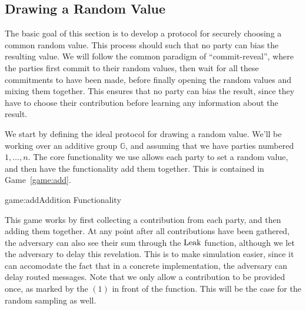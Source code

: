 \subsection{Drawing a Random Value}

The basic goal of this section is to develop a protocol for securely
choosing a common random value.
This process should such that no party can bias the resulting value.
We will follow the common paradigm of ``commit-reveal'', where the parties
first commit to their random values, then wait for all these commitments to have been made,
before finally opening the random values and mixing them together.
This ensures that no party can bias the result, since they have to choose
their contribution before learning any information about the result.

We start by defining the ideal protocol for drawing a random value.
We'll be working over an additive group $\mathbb{G}$,
and assuming that we have parties numbered $1, \ldots, n$.
The core functionality we use allows each party to set a random value,
and then have the functionality add them together.
This is contained in Game~\ref{game:add}.

\begin{game}{game:add}{Addition Functionality}
\end{game}

This game works by first collecting a contribution from each party,
and then adding them together.
At any point after all contributions have been gathered,
the adversary can also see their sum through the $\text{Leak}$ function,
although we let the adversary to delay this revelation.
This is to make simulation easier, since it can accomodate
the fact that in a concrete implementation, the adversary can delay
routed messages.
Note that we only allow a contribution to be provided once,
as marked by the $(1)$ in front of the function.
This will be the case for the random sampling as well.

